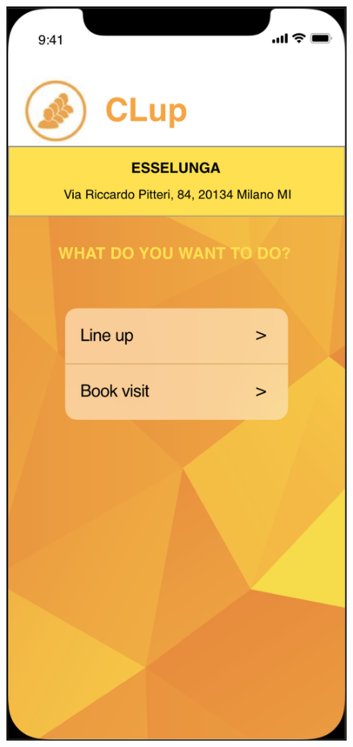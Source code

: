 \documentclass{article}
\begin{document}
\begin{figure}[H]
\begin{minipage}[b]{0.4\textwidth}
\centering
\includegraphics[width=\textwidth]{FunctionalitySelection.png}

\end{minipage}
\end{figure}
\end{document}
